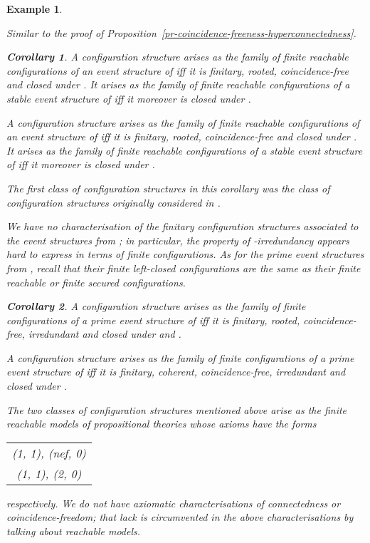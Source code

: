 \documentclass[twocolumn]{article}
\newtheorem{coro}{Corollary}
\newtheorem{exam}{Example}
\newenvironment{corollary}[1]{\begin{coro} \rm \label{cor-#1} }{\end{coro}}
\newenvironment{example}[1]{\begin{exam} \rm \label{ex-#1} }{\end{exam}}
\newenvironment{proof}{\begin{trivlist} \item[\hspace{\labelsep}\bf
Proof:]}{\hfill \end{trivlist}}
\newcommand{\pr}[1]{Proposition~\ref{pr-#1}}
\begin{document}
\begin{example}{causality}
\begin{proof}
\begin{proof}
Similar to the proof of \pr{coincidence-freeness-hyperconnectedness}.
\pagebreak[3]
\end{proof}

\begin{corollary}{characterisation-Winskel finitary reachable}
A configuration structure arises as the family of finite reachable
configurations of an event structure of \cite{Wi87a} iff it is
finitary, rooted, coincidence-free and closed under .  It
arises as the family of finite reachable configurations of a stable
event structure of \cite{Wi87a} iff it moreover is closed under
.

A configuration structure arises as the family of finite reachable
configurations of an event structure of \cite{Wi89} iff it is
finitary, rooted, coincidence-free and closed under .
It arises as the family of finite reachable configurations of a
stable event structure of \cite{Wi89} iff it moreover is closed under
.
\hfill 
\end{corollary}
The first class of configuration structures in this corollary was the
class of configuration structures originally considered in \cite{GG90}.

We have no characterisation of the finitary configuration structures
associated to the event structures from \cite{NPW81}; in particular,
the property of -irredundancy appears hard to express in terms of
finite configurations. As for the prime event structures from
\cite{Wi87a,Wi89}, recall that their finite left-closed configurations
are the same as their finite reachable or finite secured configurations.

\begin{corollary}{characterisation-prime-Winskel finitary}
A configuration structure arises as the family of finite
configurations of a prime event structure of \cite{Wi87a} iff it is
finitary, rooted, coincidence-free, irredundant and closed under
 and .

A configuration structure arises as the family of finite
configurations of a prime event structure of \cite{Wi89} iff it is
finitary, coherent, coincidence-free, irredundant and closed under
.
\hfill 
\end{corollary}
The two classes of configuration structures mentioned above
arise as the finite reachable models of propositional
theories whose axioms have the forms
\begin{center}
\begin{tabular}{c}
(1, 1), (nef, 0)\\
(1, 1), (2, 0)
\end{tabular}
\end{center}
respectively. We do not have axiomatic characterisations of
connectedness or coincidence-freedom; that lack is circumvented in the
above characterisations by talking about \emph{reachable} models.



\end{proof}
\end{example}
\end{document}
